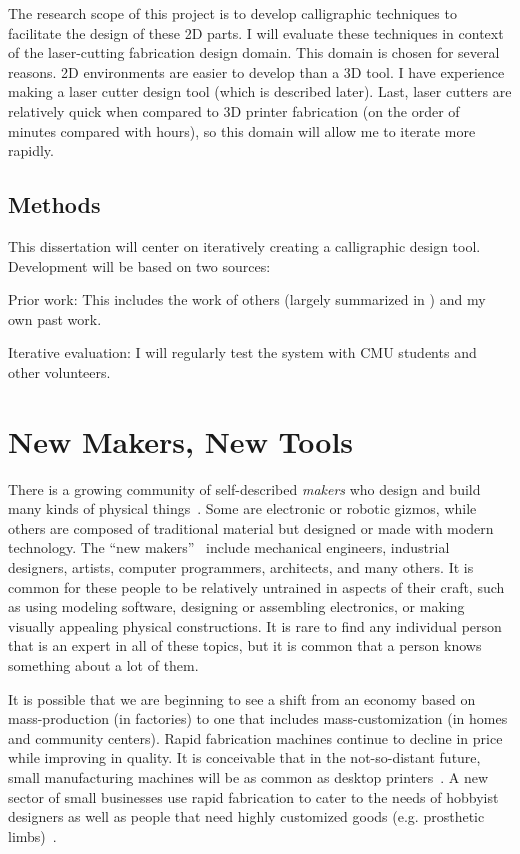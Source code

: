 \documentclass[11pt]{article}
\newenvironment{packed_enum}{
\begin{enumerate}
  \setlength{\itemsep}{1pt}
  \setlength{\parskip}{0pt}
  \setlength{\parsep}{0pt}
}{\end{enumerate}}
\begin{document}
The research scope of this project is to develop calligraphic
techniques to facilitate the design of these 2D parts. I will evaluate
these techniques in context of the laser-cutting fabrication design
domain. This domain is chosen for several reasons. 2D environments are
easier to develop than a 3D tool. I have experience making a laser
cutter design tool (which is described later). Last, laser cutters are
relatively quick when compared to 3D printer fabrication (on the order
of minutes compared with hours), so this domain will allow me to
iterate more rapidly.

\subsection{Methods}

This dissertation will center on iteratively creating a calligraphic
design tool. Development will be based on two sources:

\begin{packed_enum}
\item Prior work: This includes the work of others (largely summarized
  in \cite{johnson-sketch-review}) and my own past work.
\item Iterative evaluation: I will regularly test the system with CMU
  students and other volunteers. 
\end{packed_enum}

\section{New Makers, New Tools}

There is a growing community of self-described \textit{makers} who
design and build many kinds of physical
things~\cite{gershenfeld-fab}. Some are electronic or robotic gizmos,
while others are composed of traditional material but designed or made
with modern technology. The ``new makers''~\cite{gross-new-makers}
include mechanical engineers, industrial designers, artists, computer
programmers, architects, and many others. It is common for these
people to be relatively untrained in aspects of their craft, such as
using modeling software, designing or assembling electronics, or
making visually appealing physical constructions. It is rare to find
any individual person that is an expert in all of these topics, but it
is common that a person knows something about a lot of them.

It is possible that we are beginning to see a shift from an economy
based on mass-production (in factories) to one that includes
mass-customization (in homes and community centers). Rapid fabrication
machines continue to decline in price while improving in quality. It
is conceivable that in the not-so-distant future, small manufacturing
machines will be as common as desktop printers~\cite{economist-fab}. A
new sector of small businesses use rapid fabrication to cater to the
needs of hobbyist designers as well as people that need highly
customized goods (e.g. prosthetic limbs)~\cite{nyt-rapidfab}.
\end{document}
